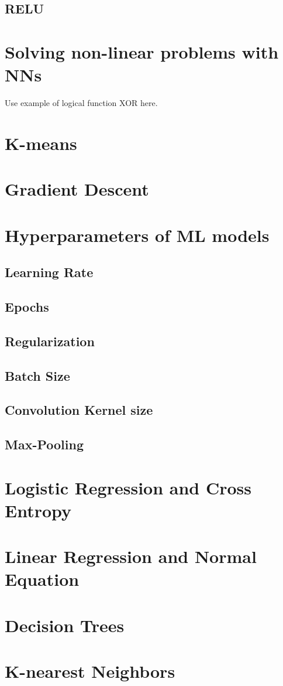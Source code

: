 \subsection{RELU}

\section{Solving non-linear problems with NNs}
Use example of logical function XOR here.

\section{K-means}

\section{Gradient Descent}

\section{Hyperparameters of ML models}

\subsection{Learning Rate}
\subsection{Epochs}
\subsection{Regularization}
\subsection{Batch Size}
\subsection{Convolution Kernel size}
\subsection{Max-Pooling}

\section{Logistic Regression and Cross Entropy}


\section{Linear Regression and Normal Equation}


\section{Decision Trees}


\section{K-nearest Neighbors}

